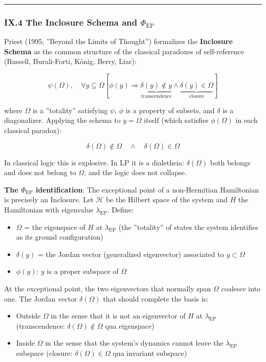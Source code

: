 \documentclass[12pt,a4paper]{article}
\begin{document}
\begin{center}
\rule{0.5\textwidth}{0.4pt}
\end{center}

\subsubsection{IX.4 The Inclosure Schema and $\Phi_\text{EP}$}

Priest (1995, ''Beyond the Limits of Thought'') formalizes the \textbf{Inclosure Schema} as the common structure of the classical paradoxes of self-reference (Russell, Burali-Forti, K\"onig, Berry, Liar):

\[\psi(\Omega), \quad \forall y \subseteq \Omega \left[\phi(y) \Rightarrow \underbrace{\delta(y) \notin y}_{\text{transcendence}} \wedge \underbrace{\delta(y) \in \Omega}_{\text{closure}}\right]\]

where $\Omega$ is a ''totality'' satisfying $\psi$, $\phi$ is a property of subsets, and $\delta$ is a diagonalizer. Applying the schema to $y = \Omega$ itself (which satisfies $\phi(\Omega)$ in each classical paradox):

\[\delta(\Omega) \notin \Omega \quad \wedge \quad \delta(\Omega) \in \Omega\]

In classical logic this is explosive. In LP it is a dialetheia: $\delta(\Omega)$ both belongs and does not belong to $\Omega$, and the logic does not collapse.

\textbf{The $\Phi_\text{EP}$ identification}: The exceptional point of a non-Hermitian Hamiltonian is precisely an Inclosure. Let $\mathcal{H}$ be the Hilbert space of the system and $H$ the Hamiltonian with eigenvalue $\lambda_\text{EP}$. Define:

\begin{itemize}
    \item $\Omega$ = the eigenspace of $H$ at $\lambda_\text{EP}$ (the ''totality'' of states the system identifies as its ground configuration)
    \item $\delta(y)$ = the Jordan vector (generalized eigenvector) associated to $y \subset \Omega$
    \item $\phi(y)$: $y$ is a proper subspace of $\Omega$
\end{itemize}

At the exceptional point, the two eigenvectors that normally span $\Omega$ coalesce into one. The Jordan vector $\delta(\Omega)$ that should complete the basis is:

\begin{itemize}
    \item Outside $\Omega$ in the sense that it is not an eigenvector of $H$ at $\lambda_\text{EP}$ (transcendence: $\delta(\Omega) \notin \Omega$ qua eigenspace)
    \item Inside $\Omega$ in the sense that the system's dynamics cannot leave the $\lambda_\text{EP}$ subspace (closure: $\delta(\Omega) \in \Omega$ qua invariant subspace)
\end{itemize}
\end{document}
